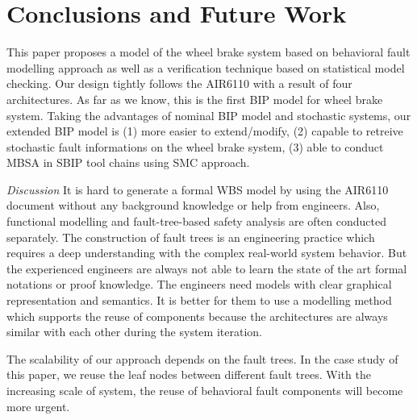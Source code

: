 \documentclass[runningheads]{llncs}
\begin{document}
\section{Conclusions and Future Work}
This paper proposes a model of the wheel brake system based on behavioral fault modelling approach as well as a verification technique based on statistical model checking. Our design tightly follows the AIR6110 with a result of four architectures. As far as we know, this is the first BIP model for wheel brake system. Taking the advantages of nominal BIP model and stochastic systems, our extended BIP model is (1) more easier to extend/modify, (2) capable to retreive stochastic fault informations on the wheel brake system, (3) able to conduct MBSA in SBIP tool chains using SMC approach.

\begin{comment}
The work of\cite{aadl14}\cite{aadl} focused on an extension of AADL Error Model called Annex, using WBS as an example. They find it hard to adding faults to existing components, and the integration process can obscure the nominal behaviors of the model. The paper\cite{cav15} proposes a formal modelling and analysis of WBS based on an integration of serveral approaches including OCRA, NuXmv and xSAP. They using a cluster of machines with massive memories and time, but also faces with time out problems during computation. However (1) our model is more easier to extend/modify due to the use of the component-based design approach, (2) the integrated model is more concrete due to the use of our behavioral fault modelling approach, (3) we are capable to retreive stochastic informations on the wheel brake system.
\end{comment}

\emph{Discussion} It is hard to generate a formal WBS model by using the AIR6110 document without any background knowledge or help from engineers. Also, functional modelling and fault-tree-based safety analysis are often conducted separately.  The construction of fault trees is an engineering practice which requires a deep understanding with the complex real-world system behavior. But the experienced engineers are always not able to learn the state of the art formal notations or proof knowledge. The engineers need models with clear graphical representation and semantics. It is better for them to use a modelling method which supports the reuse of components because the architectures are always similar with each other during the system iteration.

The scalability of our approach depends on the fault trees. In the case study of this paper, we reuse the leaf nodes between different fault trees. With the increasing scale of system, the reuse of behavioral fault components will become more urgent.
\end{document}
